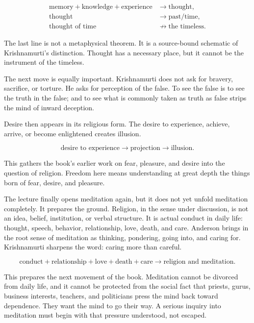 \documentclass[11pt,oneside]{book}
\begin{document}
\begin{align}
\text{memory}+\text{knowledge}+\text{experience}
&\longrightarrow \text{thought},\\
\text{thought}
&\longrightarrow \text{past/time},\\
\text{thought of time}
&\not\longrightarrow \text{the timeless}.
\end{align}

The last line is not a metaphysical theorem. It is a source-bound schematic of Krishnamurti's distinction. Thought has a necessary place, but it cannot be the instrument of the timeless.

The next move is equally important. Krishnamurti does not ask for bravery, sacrifice, or torture. He asks for perception of the false. To see the false is to see the truth in the false; and to see what is commonly taken as truth as false strips the mind of inward deception.

Desire then appears in its religious form. The desire to experience, achieve, arrive, or become enlightened creates illusion.

\begin{equation}
\text{desire to experience}
\longrightarrow
\text{projection}
\longrightarrow
\text{illusion}.
\end{equation}

This gathers the book's earlier work on fear, pleasure, and desire into the question of religion. Freedom here means understanding at great depth the things born of fear, desire, and pleasure.

The lecture finally opens meditation again, but it does not yet unfold meditation completely. It prepares the ground. Religion, in the sense under discussion, is not an idea, belief, institution, or verbal structure. It is actual conduct in daily life: thought, speech, behavior, relationship, love, death, and care. Anderson brings in the root sense of meditation as thinking, pondering, going into, and caring for. Krishnamurti sharpens the word: caring more than careful.

\begin{equation}
\text{conduct}+\text{relationship}+\text{love}+\text{death}+\text{care}
\longrightarrow
\text{religion and meditation}.
\end{equation}

This prepares the next movement of the book. Meditation cannot be divorced from daily life, and it cannot be protected from the social fact that priests, gurus, business interests, teachers, and politicians press the mind back toward dependence. They want the mind to go their way. A serious inquiry into meditation must begin with that pressure understood, not escaped.
\end{document}
